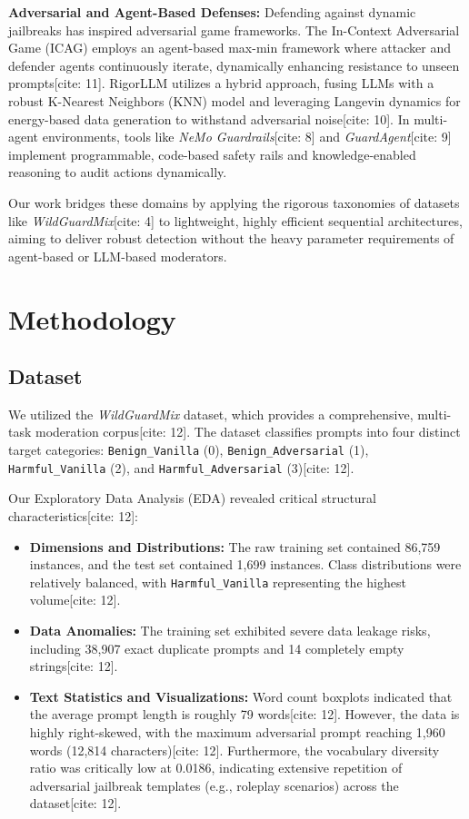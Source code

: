 \documentclass[11pt]{article}
\begin{document}
\textbf{Adversarial and Agent-Based Defenses:} Defending against dynamic jailbreaks has inspired adversarial game frameworks. The In-Context Adversarial Game (ICAG) employs an agent-based max-min framework where attacker and defender agents continuously iterate, dynamically enhancing resistance to unseen prompts[cite: 11]. RigorLLM utilizes a hybrid approach, fusing LLMs with a robust K-Nearest Neighbors (KNN) model and leveraging Langevin dynamics for energy-based data generation to withstand adversarial noise[cite: 10]. In multi-agent environments, tools like \textit{NeMo Guardrails}[cite: 8] and \textit{GuardAgent}[cite: 9] implement programmable, code-based safety rails and knowledge-enabled reasoning to audit actions dynamically.

Our work bridges these domains by applying the rigorous taxonomies of datasets like \textit{WildGuardMix}[cite: 4] to lightweight, highly efficient sequential architectures, aiming to deliver robust detection without the heavy parameter requirements of agent-based or LLM-based moderators.

\section{Methodology}

\subsection{Dataset}
We utilized the \textit{WildGuardMix} dataset, which provides a comprehensive, multi-task moderation corpus[cite: 12]. The dataset classifies prompts into four distinct target categories: \texttt{Benign\_Vanilla} (0), \texttt{Benign\_Adversarial} (1), \texttt{Harmful\_Vanilla} (2), and \texttt{Harmful\_Adversarial} (3)[cite: 12]. 

Our Exploratory Data Analysis (EDA) revealed critical structural characteristics[cite: 12]:
\begin{itemize}
    \item \textbf{Dimensions and Distributions:} The raw training set contained 86,759 instances, and the test set contained 1,699 instances. Class distributions were relatively balanced, with \texttt{Harmful\_Vanilla} representing the highest volume[cite: 12].
    \item \textbf{Data Anomalies:} The training set exhibited severe data leakage risks, including 38,907 exact duplicate prompts and 14 completely empty strings[cite: 12].
    \item \textbf{Text Statistics and Visualizations:} Word count boxplots indicated that the average prompt length is roughly 79 words[cite: 12]. However, the data is highly right-skewed, with the maximum adversarial prompt reaching 1,960 words (12,814 characters)[cite: 12]. Furthermore, the vocabulary diversity ratio was critically low at 0.0186, indicating extensive repetition of adversarial jailbreak templates (e.g., roleplay scenarios) across the dataset[cite: 12].
\end{itemize}
\end{document}
